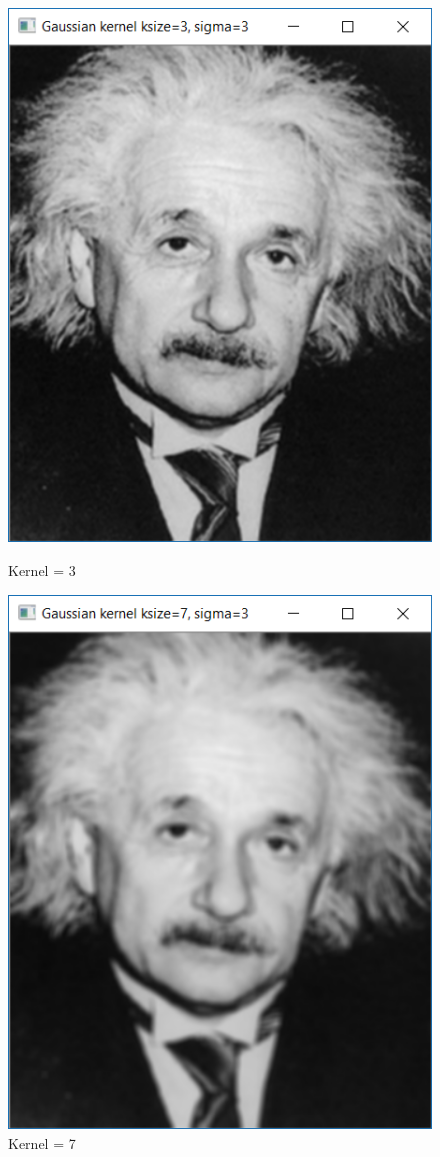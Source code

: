 \documentclass{article}
\begin{document}
\begin{figure}[h]
\begin{minipage}[b]{0.5\linewidth}
\centering
\includegraphics[scale=0.5]{2a1.PNG}
\caption{Kernel = 3}	
\end{minipage}
\begin{minipage}[b]{0.5\linewidth}
\centering
\includegraphics[scale=0.5]{2a2.PNG}
\caption{Kernel = 7}
\end{minipage}

\end{figure}
\end{document}
